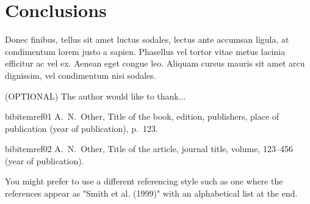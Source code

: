 \documentclass[12pt, onecolumn]{revtex4}    %
\begin{document}
\section{Conclusions}
Donec finibus, tellus sit amet luctus sodales, lectus ante accumsan ligula, at condimentum lorem justo a sapien. Phasellus vel tortor vitae metus lacinia efficitur ac vel ex. Aenean eget congue leo. Aliquam cursus mauris sit amet arcu dignissim, vel condimentum nisi sodales. 

\begin{acknowledgments}

(OPTIONAL) The author would like to thank...

\end{acknowledgments}

\begin{thebibliography}{}

bibitem{ref01} A.~N.~Other, Title of the book, edition, publishers, place of publication (year of publication), p.~123.   %

bibitem{ref02} A.~N.~Other, Title of the article, journal title, volume, 123--456 (year of publication).   %

 You might prefer to use a different referencing style such as one where the references appear as "Smith et al. (1999)" with an alphabetical list at the end.

\end{thebibliography} 
\end{document}

